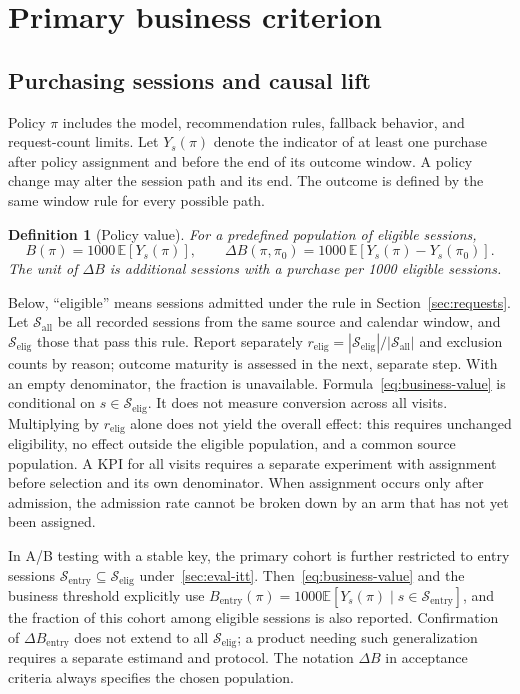 \documentclass[12pt,a4paper]{article}
\newcommand{\E}{\mathbb E}
\theoremstyle{plainru}
\newtheorem{definition}{Definition}[section]
\begin{document}
\section{Primary business criterion}\label{sec:business}

\subsection{Purchasing sessions and causal lift}

Policy \(\pi\) includes the model, recommendation rules, fallback behavior,
and request-count limits. Let \(Y_s(\pi)\) denote
the indicator of at least one purchase after policy assignment
and before the end of its outcome window. A policy change
may alter the session path and its end. The outcome is defined
by the same window rule for every possible path.

\begin{definition}[Policy value]
For a predefined population of eligible sessions,
\begin{equation}\label{eq:business-value}
B(\pi)=1000\,\E[Y_s(\pi)],\qquad
\Delta B(\pi,\pi_0)=1000\,\E[Y_s(\pi)-Y_s(\pi_0)].
\end{equation}
The unit of \(\Delta B\) is additional sessions with a purchase
per 1000 eligible sessions.
\end{definition}

Below, ``eligible'' means sessions admitted under the rule in
Section~\ref{sec:requests}. Let $\mathcal S_{\mathrm{all}}$
be all recorded sessions from the same source and calendar window,
and $\mathcal S_{\mathrm{elig}}$ those that pass this rule. Report separately
$r_{\mathrm{elig}}=|\mathcal S_{\mathrm{elig}}|/|\mathcal S_{\mathrm{all}}|$
and exclusion counts by reason; outcome maturity is assessed in the next,
separate step. With an empty denominator, the fraction is unavailable.
Formula~\eqref{eq:business-value} is conditional on $s\in\mathcal S_{\mathrm{elig}}$.
It does not measure conversion across all visits. Multiplying by $r_{\mathrm{elig}}$
alone does not yield the overall effect: this requires unchanged eligibility, no
effect outside the eligible population, and a common source population. A KPI for all visits
requires a separate experiment with assignment before selection and its own
denominator. When assignment occurs only after admission, the admission rate cannot
be broken down by an arm that has not yet been assigned.

In A/B testing with a stable key, the primary cohort is further restricted
to entry sessions $\mathcal S_{\mathrm{entry}}\subseteq\mathcal S_{\mathrm{elig}}$
under~\ref{sec:eval-itt}. Then~\eqref{eq:business-value} and the business threshold
explicitly use $B_{\mathrm{entry}}(\pi)=1000\E[Y_s(\pi)\mid
s\in\mathcal S_{\mathrm{entry}}]$, and the fraction of this cohort
among eligible sessions is also reported. Confirmation of $\Delta B_{\mathrm{entry}}$
does not extend to all $\mathcal S_{\mathrm{elig}}$; a product needing such
generalization requires a separate estimand and protocol. The notation
$\Delta B$ in acceptance criteria always specifies the chosen population.
\end{document}
